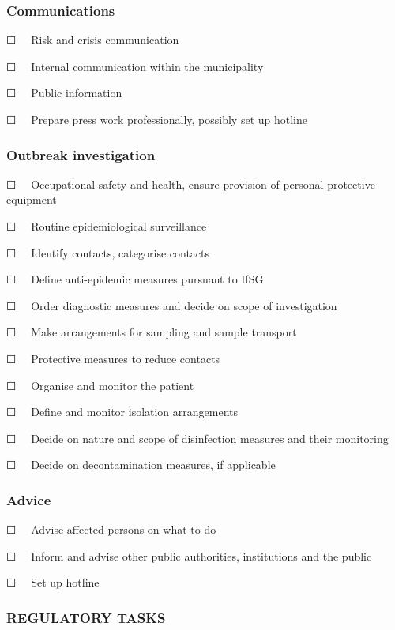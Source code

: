 \documentclass{article}
\begin{document}
\subsubsection{Communications}\label{H1662235}



☐   Risk and crisis communication


☐   Internal communication within the municipality


☐   Public information


☐   Prepare press work professionally, possibly set up hotline 


\subsubsection{Outbreak investigation }\label{H6402131}



☐   Occupational safety and health, ensure provision of personal protective equipment


☐   Routine epidemiological surveillance


☐   Identify contacts, categorise contacts


☐   Define anti-epidemic measures pursuant to IfSG


☐   Order diagnostic measures and decide on scope of investigation


☐   Make arrangements for sampling and sample transport


☐   Protective measures to reduce contacts


☐   Organise and monitor the patient


☐   Define and monitor isolation arrangements 


☐   Decide on nature and scope of disinfection measures and their monitoring


☐   Decide on decontamination measures, if applicable 


\subsubsection{Advice}\label{H4067619}



☐   Advise affected persons on what to do


☐   Inform and advise other public authorities, institutions and the public


☐   Set up hotline


\subsubsection{REGULATORY TASKS}\label{H7293213}
\end{document}
